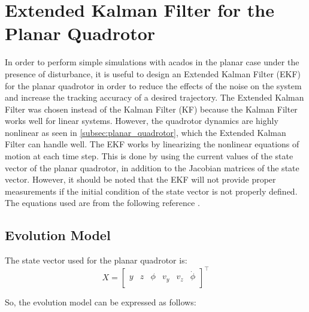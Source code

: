 \documentclass{thesisreport}
\begin{document}
\newpage

\section{Extended Kalman Filter for the Planar Quadrotor}
In order to perform simple simulations with acados in the planar case under the presence of disturbance, it is useful to design an Extended Kalman Filter (EKF) for the planar quadrotor in order to reduce the effects of the noise on the system and increase the tracking accuracy of a desired trajectory. The Extended Kalman Filter was chosen instead of the Kalman Filter (KF) because the Kalman Filter works well for linear systems. However, the quadrotor dynamics are highly  nonlinear as seen in \ref{subsec:planar_quadrotor}, which the Extended Kalman Filter can handle well. The EKF works by linearizing the nonlinear equations of motion at each time step. This is done by using the current values of the state vector of the planar quadrotor, in addition to the Jacobian matrices of the state vector. However, it should be noted that the EKF will not provide proper measurements if the initial condition of the state vector is not properly defined. The equations used are from the following reference \cite{AUVE2020}.

\subsection{Evolution Model}

The state vector used for the planar quadrotor is: 
\begin{equation}\label{planar_drone_states}
	X = \begin{bmatrix}
		y & z & \phi & v_y & v_z & \dot{\phi} \\ 
	\end{bmatrix}^{\intercal}
\end{equation}

So, the evolution model can be expressed as follows: 
\end{document}

